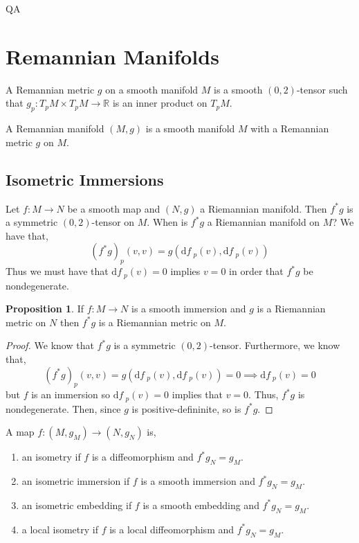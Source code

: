 QA	 \documentclass[12pt]{extarticle}
\newcommand{\R}{\mathbb{R}}
\renewcommand{\d}[1]{ \mathrm{d}#1 \:}
\theoremstyle{definition}
\newtheorem{proposition}[theorem]{Proposition}
\newenvironment{definition}[1][Definition:]{\begin{trivlist}
\item[\hskip \labelsep {\bfseries #1}]}{\end{trivlist}}
\begin{document}
\section{Remannian Manifolds}

\begin{definition}
A Remannian metric $g$ on a smooth manifold $M$ is a smooth $(0,2)$-tensor such that $g_p : T_p M \times T_p M \to \R$ is an inner product on $T_p M$. 
\end{definition}

\begin{definition}
A Remannian manifold $(M, g)$ is a smooth manifold $M$ with a Remannian metric $g$ on $M$. 
\end{definition}

\subsection{Isometric Immersions}

Let $f : M \to N$ be a smooth map and $(N, g)$ a Riemannian manifold. Then $f^*g$ is a symmetric $(0,2)$-tensor on $M$. When is $f^* g$ a Riemannian manifold on $M$? We have that,
\[ (f^* g)_p(v, v) = g(\d{f}_p(v), \d{f}_p(v)) \]
Thus we must have that $\d{f}_p(v) = 0$ implies $v = 0$ in order that $f^* g$ be nondegenerate.

\begin{proposition}
If $f : M \to N$ is a smooth immersion and $g$ is a Riemannian metric on $N$ then $f^* g$ is a Riemannian metric on $M$.
\end{proposition}

\begin{proof}
We know that $f^* g$ is a symmetric $(0,2)$-tensor. Furthermore, we know that,
\[ (f^* g)_p(v,v) = g(\d{f}_p(v), \d{f}_p(v)) = 0 \implies \d{f}_p(v) = 0 \]
but $f$ is an immersion so $\d{f}_p(v) = 0$ implies that $v = 0$. Thus, $f^* g$ is nondegenerate. Then, since $g$ is positive-defininite, so is $f^* g$. 
\end{proof}

\begin{definition}
A map $f : (M, g_M) \to (N, g_N)$ is,
\begin{enumerate}
\item an isometry if $f$ is a diffeomorphism and $f^* g_N = g_M$. 
\item an isometric immersion if $f$ is a smooth immersion and $f^* g_N = g_M$.
\item an isometric embedding if $f$ is a smooth embedding and $f^* g_N = g_M$.
\item  a local isometry if $f$ is a local diffeomorphism and $f^* g_N = g_M$. 
\end{enumerate}
\end{definition}
\end{document}

